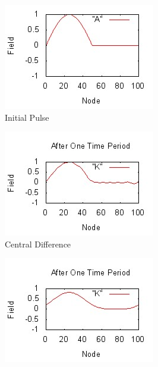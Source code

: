 \documentclass[a4paper,12pt]{report}
\begin{document}
\begin{figure}[h!]  
	\centering
	\begin{subfigure}[b]{0.4\textwidth}
		\includegraphics[width=\textwidth]{hfsine.jpeg}
                \caption{Initial Pulse}
                \label{fig:hfsine}
	\end{subfigure}
	\begin{subfigure}[b]{0.4\textwidth}
		\includegraphics[width=\textwidth]{hfsinrk3ctd.jpeg}
                \caption{Central Difference}
                \label{fig:hfctd}
	\end{subfigure}
	\begin{subfigure}[b]{0.4\textwidth}
		\includegraphics[width=\textwidth]{hfsinrk4upw.jpeg}

\end{subfigure}
\end{figure}
\end{document}
